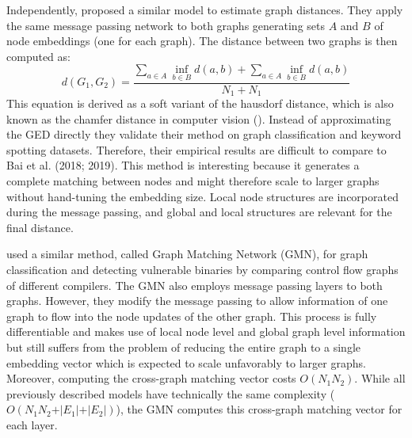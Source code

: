 Independently, \cite{riba2018} proposed a similar model to estimate graph distances. They apply the same message passing network to both graphs generating sets $A$ and $B$ of node embeddings (one for each graph). The distance between two graphs is then computed as:
\begin{equation}
     d(G_{1}, G_{2}) = \frac{\sum_{a \in A} \inf_{b \in B} d(a, b) + \sum_{a \in A} \inf_{b \in B} d(a, b)}{N_1 + N_1}
\end{equation}
This equation is derived as a soft variant of the hausdorf distance, which is also known as the chamfer distance in computer vision (\citealp{chamfer1977}). Instead of approximating the GED directly they validate their method on graph classification and keyword spotting datasets. Therefore, their empirical results are difficult to compare to Bai et al. (2018; 2019). This method is interesting because it generates a complete matching between nodes and might therefore scale to larger graphs without hand-tuning the embedding size. Local node structures are incorporated during the message passing, and global and local structures are relevant for the final distance.

\cite{li2019} used a similar method, called Graph Matching Network (GMN), for graph classification and detecting vulnerable binaries by comparing control flow graphs of different compilers. The GMN also employs message passing layers to both graphs. However, they modify the message passing to allow information of one graph to flow into the node updates of the other graph. %
This process is fully differentiable and makes use of local node level and global graph level information but still suffers from the problem of reducing the entire graph to a single embedding vector which is expected to scale unfavorably to larger graphs. Moreover, computing the cross-graph matching vector costs $O(N_1 N_2)$. While all previously described models have technically the same complexity ($O(N_1 N_2 + \vert E_1 \vert + \vert E_2 \vert)$), the GMN computes this cross-graph matching vector for each layer.



